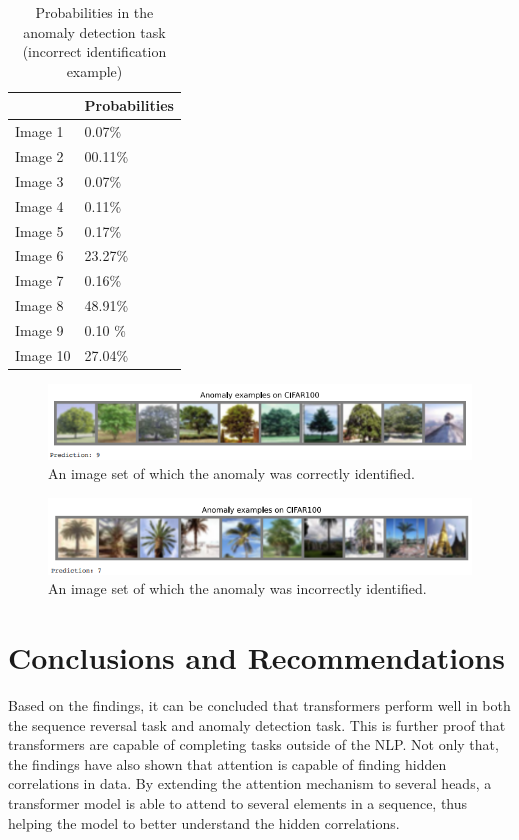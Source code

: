 \documentclass[peerreview]{IEEEtran}
\begin{document}
\begin{table}[h] 
\centering 
\begin{tabular}{l l}
\toprule 
 & Probabilities\\ 
\midrule
Image 1 & 0.07\% \\ 
Image 2 & 00.11\% \\ 
Image 3 & 0.07\% \\
Image 4 & 0.11\% \\
Image 5 & 0.17\% \\
Image 6 & 23.27\% \\ 
Image 7 & 0.16\% \\
Image 8 & 48.91\% \\
Image 9 & 0.10 \% \\ 
Image 10 & 27.04\%\\
\bottomrule
\end{tabular}
\smallskip 
\caption{Probabilities in the anomaly detection task (incorrect identification example)} 
\label{tab:probabilities} 
\end{table}


\begin{figure}[!h]
\centering
\includegraphics[width=1\columnwidth]{anomaly_correct} 
\caption{An image set of which the anomaly was correctly identified.}
\label{anomaly_correct}
\end{figure}

\begin{figure}[!h]
\centering
\includegraphics[width=1\columnwidth]{anomaly_incorrect} 
\caption{An image set of which the anomaly was incorrectly identified.}
\label{anomaly_incorrect}
\end{figure}


\section{Conclusions and Recommendations}
Based on the findings, it can be concluded that transformers perform well in both the sequence reversal task and anomaly detection task. This is further proof that transformers are capable of completing tasks outside of the NLP. Not only that, the findings have also shown that attention is capable of finding hidden correlations in data. By extending the attention mechanism to several heads, a transformer model is able to attend to several elements in a sequence, thus helping the model to better understand the hidden correlations.
\end{document}
